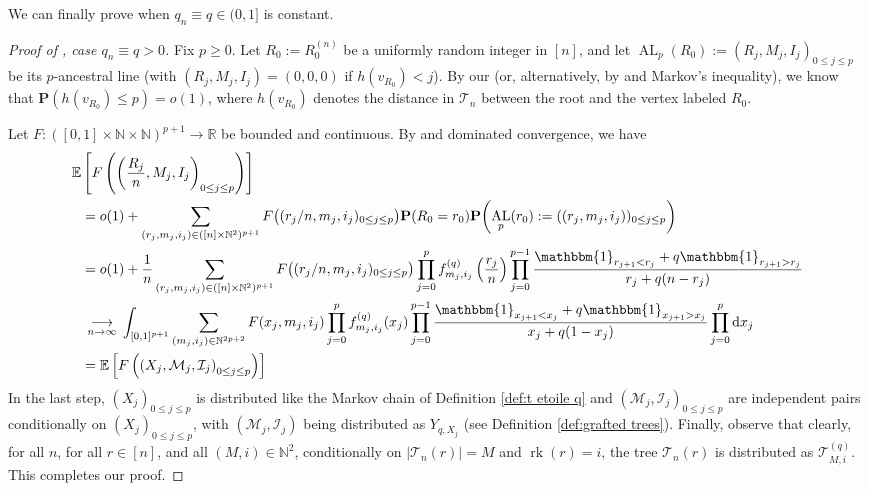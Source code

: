 \documentclass{article}
\theoremstyle{remark}
\newcommand{\bN}{\mathbb{N}}
\newcommand{\bR}{\mathbb{R}}
\newcommand{\cv}[1]{\,\underset{#1}{\longrightarrow}\,}
\newcommand{\cT}{\mathcal{T}}
\newcommand{\cM}{\mathcal{M}}
\newcommand{\cI}{\mathcal{I}}
\newcommand{\bE}{\mathbb{E}}
\newcommand{\prob}[1]{\mathbf{P}{\left(#1\right)}}
\newcommand{\One}[1]{\mathbbm{1}_{#1}}
\DeclareMathOperator{\rk}{rk}
\DeclareMathOperator{\AncestralLine}{AL}
\begin{document}
We can finally prove  when $q_n \equiv q\in(0,1]$ is constant.
\medskip

\begin{proof}[Proof of , case $q_n \equiv q > 0$]
Fix $p \geq 0$. 
Let $R_0 := R^{(n)}_0$ be a uniformly random integer in $[n]$, and let $\AncestralLine_p(R_0) := (R_j,M_j,I_j)_{0 \leq j \leq p}$ be its $p$-ancestral line (with $(R_j,M_j,I_j)=(0,0,0)$ if $h(v_{R_0})<j$). 
By our  (or, alternatively, by \cite[Proposition 24]{Thevenin_Wagner_2023} and Markov's inequality), we know that $\prob{h(v_{R_0}) \leq p} = o(1)$, where $h(v_{R_0})$ denotes the distance in $\cT_n$ between the root and the vertex labeled $R_0$.

Let $F: ([0,1] \times \bN \times \bN)^{p+1} \rightarrow \bR$ be bounded and continuous. 
By  and dominated convergence, we have
\begin{align*}
\bE&\left[ F\left(\left(\frac{R_j}{n},M_j,I_j\right)_{0 \leq j \leq p}\right) \right]\\ 
& = o(1)+\sum_{(r_j,m_j,i_j) \in ([n] \times \bN^2)^{p+1}} F\big( (r_j/n,m_j,i_j)_{0 \leq j \leq p} \big) \prob{R_0=r_0} \prob{\AncestralLine_p(r_0) := ((r_j,m_j,i_j))_{0 \leq j \leq p}}\\
& = o(1) + \frac{1}{n}\sum_{(r_j,m_j,i_j) \in ([n]\times \bN^2)^{p+1}} F\big( (r_j/n,m_j,i_j)_{0 \leq j \leq p} \big)\prod_{j=0}^p f_{m_j,i_j}^{(q)}\left( \frac{r_j}{n} \right) \prod_{j=0}^{p-1} \frac{\One{r_{j+1} < r_j} + q \One{r_{j+1} > r_j}}{r_j + q(n-r_j)}\\
& \cv{n\to\infty} \int_{[0,1]^{p+1}} \sum_{(m_j,i_j) \in \bN^{2p+2}} F(x_j,m_j,i_j) \prod_{j=0}^p f_{m_j,i_j}^{(q)}(x_j) \prod_{j=0}^{p-1} \frac{\One{x_{j+1}<x_j}+q\One{x_{j+1}>x_j}}{x_j+q(1-x_j)} \prod_{j=0}^p \mathrm dx_j\\
&=\bE\left[F\left( \left(X_j,\cM_j,\cI_j\right)_{0 \leq j \leq p} \right)\right]
\end{align*}
In the last step, $(X_j)_{0 \leq j \leq p}$ is distributed like the Markov chain of Definition \ref{def:t etoile q} and $(\cM_j,\cI_j)_{0 \leq j \leq p}$ are independent pairs conditionally on $(X_j)_{0 \leq j \leq p}$, with $(\cM_j,\cI_j)$ being distributed as $Y_{q,X_j}$ (see Definition \ref{def:grafted trees}). 
Finally, observe that clearly, for all $n$, for all $r \in [n]$, and all $(M,i) \in \bN^2$, conditionally on $|\cT_n(r)|=M$ and $\rk(r)=i$, the tree $\cT_n(r)$ is distributed as $\cT_{M,i}^{(q)}$. 
This completes our proof.
\end{proof}
\end{document}
